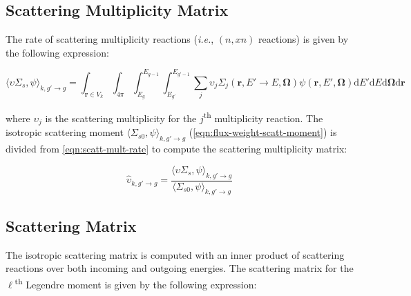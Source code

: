 \subsection{Scattering Multiplicity Matrix}
\label{subsubsec:tally-types-mult-mat}

The rate of scattering multiplicity reactions (\textit{i.e.}, $(n,xn)$ reactions) is given by the following expression:

\begin{equation}
\label{eqn:scatt-mult-rate}
\langle \upsilon \Sigma_{s}, \psi \rangle_{k,g'\rightarrow g} = \int_{\mathbf{r} \in V_{k}} \int_{4\pi} \int_{E_g}^{E_{g-1}} \int_{E_{g'}}^{E_{g'-1}} \sum_j \upsilon_j \Sigma_j (\mathbf{r}, E' \rightarrow E, \mathbf{\Omega}) \psi(\mathbf{r}, E', \mathbf{\Omega}) \mathrm{d}E'\mathrm{d}E\mathrm{d}\mathbf{\Omega}\mathrm{d}\mathbf{r}
\end{equation}

\noindent where $\upsilon_j$ is the scattering multiplicity for the $j$\textsuperscript{th} multiplicity reaction. The isotropic scattering moment $\langle \Sigma_{s0}, \psi \rangle_{k,g'\rightarrow g}$ (\cref{eqn:flux-weight-scatt-moment}) is divided from \cref{eqn:scatt-mult-rate} to compute the scattering multiplicity matrix:

\begin{equation}
\label{eqn:scatt-mult-mat}
\hat{\upsilon}_{k,g'\rightarrow g} = \frac{{\langle \upsilon \Sigma_{s}, \psi \rangle}_{k,g'\rightarrow g}}{{\langle \Sigma_{s0}, \psi \rangle}_{k,g'\rightarrow g}}
\end{equation}


\subsection{Scattering Matrix}
\label{subsubsec:tally-types-scatt-mat}

The isotropic scattering matrix is computed with an inner product of scattering reactions over both incoming and outgoing energies. The scattering matrix for the $\ell$\textsuperscript{th} Legendre moment is given by the following expression:



